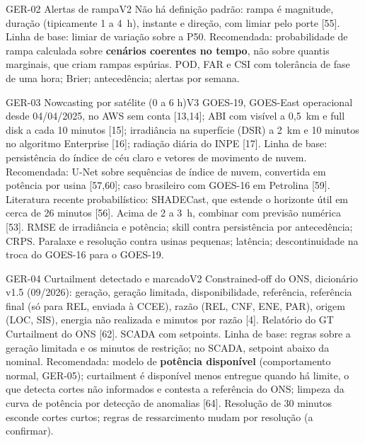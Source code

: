 \begin{ficha}{GER-02 \textperiodcentered{} Alertas de rampa}{V2}
 Não há definição padrão: rampa é magnitude, duração
(tipicamente 1 a 4~h), instante e direção, com limiar pelo porte [55].
Linha de base: limiar de variação sobre a P50. Recomendada: probabilidade de
rampa calculada sobre \textbf{cenários coerentes no tempo}, não sobre quantis
marginais, que criam rampas espúrias.
 POD, FAR e CSI com tolerância de fase de uma hora; Brier;
antecedência; alertas por semana.
\end{ficha}

\begin{ficha}{GER-03 \textperiodcentered{} Nowcasting por satélite (0 a 6 h)}{V3}
 GOES-19, GOES-East operacional desde 04/04/2025, no AWS sem
conta [13,14]; ABI com visível a 0,5~km e full disk a cada 10 minutos [15];
irradiância na superfície (DSR) a 2~km e 10 minutos no algoritmo Enterprise
[16]; radiação diária do INPE [17].
 Linha de base: persistência do índice de céu claro e
vetores de movimento de nuvem. Recomendada: U-Net sobre sequências de índice
de nuvem, convertida em potência por usina [57,60]; caso brasileiro com
GOES-16 em Petrolina [59]. Literatura recente probabilístico: SHADECast, que
estende o horizonte útil em cerca de 26 minutos [56]. Acima de 2 a 3~h,
combinar com previsão numérica [53].
 RMSE de irradiância e potência; skill contra persistência
por antecedência; CRPS.
 Paralaxe e resolução contra usinas pequenas; latência;
descontinuidade na troca do GOES-16 para o GOES-19.
\end{ficha}

\begin{ficha}{GER-04 \textperiodcentered{} Curtailment detectado e marcado}{V2}
 Constrained-off do ONS, dicionário v1.5 (09/2026): geração,
geração limitada, disponibilidade, referência, referência final (só para
REL, enviada à CCEE), razão (REL, CNF, ENE, PAR), origem (LOC, SIS), energia
não realizada e minutos por razão [4]. Relatório do GT Curtailment do ONS
[62]. SCADA com setpoints.
 Linha de base: regras sobre a geração limitada e os
minutos de restrição; no SCADA, setpoint abaixo da nominal. Recomendada:
modelo de \textbf{potência disponível} (comportamento normal, GER-05);
curtailment é disponível menos entregue quando há limite, o que detecta
cortes não informados e contesta a referência do ONS; limpeza da curva de
potência por detecção de anomalias [64].
 Resolução de 30 minutos esconde cortes curtos; regras de
ressarcimento mudam por resolução (a confirmar).
\end{ficha}

